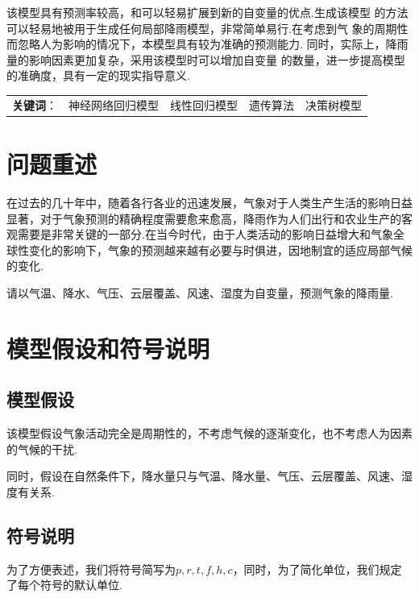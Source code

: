 \documentclass[UTF8, a4paper]{ctexart}
\begin{document}
该模型具有预测率较高，和可以轻易扩展到新的自变量的优点.生成该模型
的方法可以轻易地被用于生成任何局部降雨模型，非常简单易行.在考虑到气
象的周期性而忽略人为影响的情况下，本模型具有较为准确的预测能力.
同时，实际上，降雨量的影响因素更加复杂，采用该模型时可以增加自变量
的数量，进一步提高模型的准确度，具有一定的现实指导意义.

\null\vfill %
\begin{flushleft}
	\begin{tabular}{
		>{\centering}p{}
		>{\centering}p{}
		>{\centering}p{}
		>{\centering}p{}
		>{\centering}p{}}
		\textbf{关键词}： & 神经网络回归模型 & 线性回归模型 & 遗传算法 & 决策树模型
	\end{tabular}
\end{flushleft}

\newpage

\section{问题重述}

在过去的几十年中，随着各行各业的迅速发展，气象对于人类生产生活的影响日益
显著，对于气象预测的精确程度需要愈来愈高，降雨作为人们出行和农业生产的客
观需要是非常关键的一部分.在当今时代，由于人类活动的影响日益增大和气象全
球性变化的影响下，气象的预测越来越有必要与时俱进，因地制宜的适应局部气候的变化.

请以气温、降水、气压、云层覆盖、风速、湿度为自变量，预测气象的降雨量.

\section{模型假设和符号说明}

\subsection{模型假设}
该模型假设气象活动完全是周期性的，不考虑气候的逐渐变化，也不考虑人为因素的气候的干扰.

同时，假设在自然条件下，降水量只与气温、降水量、气压、云层覆盖、风速、湿度有关系.

\subsection{符号说明}

为了方便表述，我们将符号简写为$p,r,t,f,h,c$，同时，为了简化单位，我们规定了每个符号的默认单位.
\end{document}
